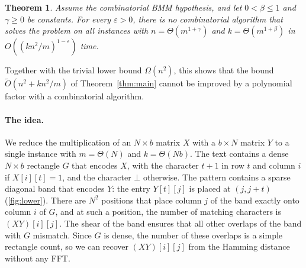 \documentclass[11pt]{article}
\newtheorem{theorem}{Theorem}
\theoremstyle{definition}
\newcommand{\tO}{\tilde{O}}
\renewcommand{\O}{O}
\begin{document}
\begin{theorem}\label{thm:lower}
Assume the combinatorial BMM hypothesis, and let $0 < \beta \le 1$ and $\gamma \ge 0$ be constants.
For every $\varepsilon > 0$, there is no combinatorial algorithm that solves the problem on all instances with $n = \Theta(m^{1+\gamma})$ and $k = \Theta(m^{1+\beta})$ in $\O((kn^2/m)^{1-\varepsilon})$ time.
\end{theorem}

Together with the trivial lower bound $\Omega(n^2)$, this shows that the bound $\tO(n^2 + kn^2/m)$ of Theorem~\ref{thm:main} cannot be improved by a polynomial factor with a combinatorial algorithm.

\paragraph{The idea.}
We reduce the multiplication of an $N \times b$ matrix $X$ with a $b \times N$ matrix $Y$ to a single instance with $m = \Theta(N)$ and $k = \Theta(Nb)$.
The text contains a dense $N \times b$ rectangle $G$ that encodes $X$, with the character $t+1$ in row $t$ and column $i$ if $X[i][t] = 1$, and the character $\bot$ otherwise.
The pattern contains a sparse diagonal band that encodes $Y$: the entry $Y[t][j]$ is placed at $(j, j+t)$ (\autoref{fig:lower}).
There are $N^2$ positions that place column $j$ of the band exactly onto column $i$ of $G$, and at such a position, the number of matching characters is $(XY)[i][j]$.
The shear of the band ensures that all other overlaps of the band with $G$ mismatch.
Since $G$ is dense, the number of these overlaps is a simple rectangle count, so we can recover $(XY)[i][j]$ from the Hamming distance without any FFT.
\end{document}
